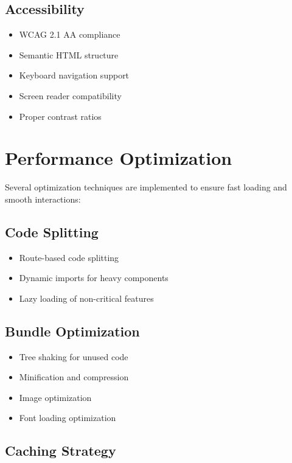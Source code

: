 \subsection{Accessibility}

\begin{itemize}
    \item WCAG 2.1 AA compliance
    \item Semantic HTML structure
    \item Keyboard navigation support
    \item Screen reader compatibility
    \item Proper contrast ratios
\end{itemize}

\section{Performance Optimization}

Several optimization techniques are implemented to ensure fast loading and smooth interactions:

\subsection{Code Splitting}

\begin{itemize}
    \item Route-based code splitting
    \item Dynamic imports for heavy components
    \item Lazy loading of non-critical features
\end{itemize}

\subsection{Bundle Optimization}

\begin{itemize}
    \item Tree shaking for unused code
    \item Minification and compression
    \item Image optimization
    \item Font loading optimization
\end{itemize}

\subsection{Caching Strategy}

